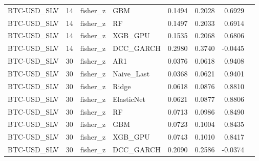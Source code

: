 \begin{table}[H]
\begin{tabular}{llllrrrr}
BTC-USD_SLV & 14 & fisher_z & GBM & 0.1494 & 0.2028 & 0.6929 &  \\
BTC-USD_SLV & 14 & fisher_z & RF & 0.1497 & 0.2033 & 0.6914 &  \\
BTC-USD_SLV & 14 & fisher_z & XGB_GPU & 0.1535 & 0.2068 & 0.6806 &  \\
BTC-USD_SLV & 14 & fisher_z & DCC_GARCH & 0.2980 & 0.3740 & -0.0445 &  \\
BTC-USD_SLV & 30 & fisher_z & AR1 & 0.0376 & 0.0618 & 0.9408 &  \\
BTC-USD_SLV & 30 & fisher_z & Naive_Last & 0.0368 & 0.0621 & 0.9401 &  \\
BTC-USD_SLV & 30 & fisher_z & Ridge & 0.0618 & 0.0876 & 0.8810 &  \\
BTC-USD_SLV & 30 & fisher_z & ElasticNet & 0.0621 & 0.0877 & 0.8806 &  \\
BTC-USD_SLV & 30 & fisher_z & RF & 0.0713 & 0.0986 & 0.8490 &  \\
BTC-USD_SLV & 30 & fisher_z & GBM & 0.0723 & 0.1004 & 0.8435 &  \\
BTC-USD_SLV & 30 & fisher_z & XGB_GPU & 0.0743 & 0.1010 & 0.8417 &  \\
BTC-USD_SLV & 30 & fisher_z & DCC_GARCH & 0.2090 & 0.2586 & -0.0374 &  \\
\bottomrule
\end{tabular}
\end{table}